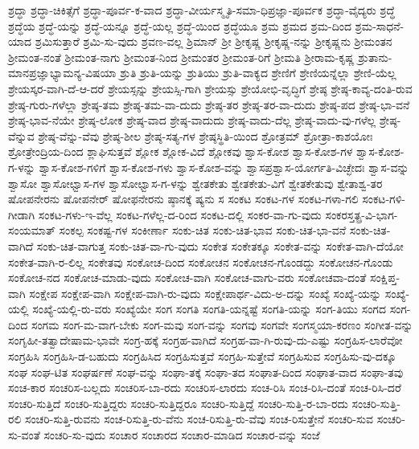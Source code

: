 {ಶ್ರದ್ಧಾ
ಶ್ರದ್ಧಾ-ಚಿಕಿತ್ಸೆಗೆ
ಶ್ರದ್ಧಾ-ಪೂರ್ವ-ಕ-ವಾದ
ಶ್ರದ್ಧಾ-ವೀರ್ಯಸ್ಮೃತಿ-ಸಮಾ-ಧಿಪ್ರಜ್ಞಾ-ಪೂರ್ವಕ
ಶ್ರದ್ಧಾ-ವೈದ್ಯರು
ಶ್ರದ್ಧೆ
ಶ್ರದ್ಧೆಯ
ಶ್ರದ್ಧೆ-ಯನ್ನು
ಶ್ರದ್ಧೆ-ಯನ್ನೂ
ಶ್ರದ್ಧೆ-ಯಲ್ಲ
ಶ್ರದ್ಧೆ-ಯಿಂದ
ಶ್ರದ್ಧೆಯೂ
ಶ್ರಮ
ಶ್ರಮದ
ಶ್ರಮ-ದಿಂದ
ಶ್ರಮ-ಸಾಧನೆ-ಯಾದ
ಶ್ರಮಿಸುತ್ತಾರೆ
ಶ್ರಮಿ-ಸು-ವುದು
ಶ್ರವಣ-ವಲ್ಲ
ಶ್ರಿಮಾನ್
ಶ್ರೀ
ಶ್ರೀಕೃಷ್ಣ
ಶ್ರೀಕೃಷ್ಣ-ನನ್ನು
ಶ್ರೀಕೃಷ್ಣನು
ಶ್ರೀಮಂತನ
ಶ್ರೀಮಂತ-ನಂತೆ
ಶ್ರೀಮಂತ-ನಾಗು
ಶ್ರೀಮಂತ-ನಿಂದ
ಶ್ರೀಮಂತರ
ಶ್ರೀಮಂತ-ರಿಗೆ
ಶ್ರೀಮತಿ
ಶ್ರೀರಾಮ-ಕೃಷ್ಣ
ಶ್ರುತಾನು-ಮಾನಪ್ರಜ್ಞಾಭ್ಯಾಮನ್ಯ-ವಿಷಯಾ
ಶ್ರುತಿ
ಶ್ರುತಿ-ಯನ್ನು
ಶ್ರುತಿಯು
ಶ್ರುತಿ-ವಾಕ್ಯದ
ಶ್ರೇಣಿಗೆ
ಶ್ರೇಣಿಯನ್ನೆಲ್ಲಾ
ಶ್ರೇಣಿ-ಯೆಲ್ಲ
ಶ್ರೇಯಸ್ಕರ-ವಾಗಿ-ದೆ-ಆ-ದರೆ
ಶ್ರೇಯಸ್ಸನ್ನು
ಶ್ರೇಯಸ್ಸಿ-ಗಾಗಿ
ಶ್ರೇಯಸ್ಸು
ಶ್ರೇಯೋಭಿ-ವೃದ್ಧಿಗೆ
ಶ್ರೇಷ್ಠ
ಶ್ರೇಷ್ಠ-ಕಾವ್ಯ-ದಂತಿ-ರುವ
ಶ್ರೇಷ್ಠ-ಗುರು-ಗಳೆಲ್ಲಾ
ಶ್ರೇಷ್ಠ-ತಮ
ಶ್ರೇಷ್ಠ-ತಮ-ವಾ-ದುದು
ಶ್ರೇಷ್ಠ-ತರ
ಶ್ರೇಷ್ಠ-ತರ-ವಾ-ದುದು
ಶ್ರೇಷ್ಠ-ಪದ
ಶ್ರೇಷ್ಠ-ಭಾ-ವನೆ
ಶ್ರೇಷ್ಠ-ಭಾವ-ನೆಯೇ
ಶ್ರೇಷ್ಠ-ಲೋಕ
ಶ್ರೇಷ್ಠ-ವಾದ
ಶ್ರೇಷ್ಠ-ವಾದುದು
ಶ್ರೇಷ್ಠ-ವಾದು-ದೆಲ್ಲ
ಶ್ರೇಷ್ಠ-ವಾದು-ವು-ಗಳೆಲ್ಲ
ಶ್ರೇಷ್ಠ-ವೆನ್ನುವ
ಶ್ರೇಷ್ಠ-ವೆನ್ನು-ವೆವು
ಶ್ರೇಷ್ಠ-ಶೀಲ
ಶ್ರೇಷ್ಠ-ಸತ್ಯ-ಗಳ
ಶ್ರೇಷ್ಠಸ್ಥಿತಿ-ಯಿಂದ
ಶ್ರೋತ್ರಮ್
ಶ್ರೋತ್ರಾ-ಕಾಶಯೋಃ
ಶ್ರೋತ್ರೇಂದ್ರಿಯ-ದಿಂದ
ಶ್ಲಾಘಿಸುತ್ತವೆ
ಶ್ಲೋಕ
ಶ್ಲೋಕ-ವಿದೆ
ಶ್ಲೋಕವು
ಶ್ವಾಸ-ಕೋಶ
ಶ್ವಾಸ-ಕೋಶ-ಗಳ
ಶ್ವಾಸ-ಕೋಶ-ಗ-ಳನ್ನು
ಶ್ವಾಸ-ಕೋಶ-ಗಳಿಗೆ
ಶ್ವಾಸ-ಕೋಶ-ಗಳು
ಶ್ವಾಸ-ಕೋಶ-ವನ್ನು
ಶ್ವಾಸಪ್ರಶ್ವಾಸ-ಯೋರ್ಗತಿ-ವಿಚ್ಛೇದಃ
ಶ್ವಾಸ-ವನ್ನು
ಶ್ವಾಸೋ
ಶ್ವಾಸೋಛ್ವಾಸ-ಗಳ
ಶ್ವಾಸೋಛ್ವಾಸ-ಗ-ಳನ್ನು
ಶ್ವೇತಕೇತು
ಶ್ವೇತಕೇತು-ವಿಗೆ
ಶ್ವೇತಕೇತುವು
ಶ್ವೇತಾಶ್ವ-ತರ
ಷೋಪನೇರನು
ಷೋಪನೇರ್
ಷೋಫನೇರನು
ಷ್ಠಾನಕ್ಕೆ
ಷ್ಯನು
ಸ
ಸಂಕಟ
ಸಂಕಟ-ಗಳ
ಸಂಕಟ-ಗಳಾ-ಗಲಿ
ಸಂಕಟ-ಗಳಿ-ಗೀಡಾಗಿ
ಸಂಕಟ-ಗಳು-ಇ-ವೆಲ್ಲ
ಸಂಕಟ-ಗಳೆಲ್ಲ-ದ-ರಿಂದ
ಸಂಕಟ-ದಲ್ಲಿ
ಸಂಕರ-ವಾ-ಗು-ವುದು
ಸಂಕರಸ್ತತ್ಪ್ರ-ವಿ-ಭಾಗ-ಸಂಯಮಾತ್
ಸಂಕಲ್ಪ
ಸಂಕಷ್ಟ-ಗಳ
ಸಂಕೀರ್ಣಾ
ಸಂಕು-ಚಿತ
ಸಂಕು-ಚಿತ-ಭಾವ
ಸಂಕು-ಚಿತ-ಭಾ-ವನೆ
ಸಂಕು-ಚಿತ-ವಾಗಿದೆ
ಸಂಕು-ಚಿತ-ವಾಗುತ್ತ
ಸಂಕು-ಚಿತ-ವಾ-ಗು-ವುದು
ಸಂಕೇತ
ಸಂಕೇತಕ್ಕೂ
ಸಂಕೇತ-ವನ್ನು
ಸಂಕೇತ-ವಾಗಿ-ದೆಯೋ
ಸಂಕೇತ-ವಾಗಿ-ರ-ಲಿಲ್ಲ
ಸಂಕೇತವು
ಸಂಕೋಚ-ದಿಂದ
ಸಂಕೋಚನ
ಸಂಕೋಚನ-ಗೊಂಡದ್ದು
ಸಂಕೋಚನ-ಗೊಂಡು
ಸಂಕೋಚ-ನದ
ಸಂಕೋಚ-ಮಾಡು-ವುದು
ಸಂಕೋಚ-ವಾಗಿ
ಸಂಕೋಚ-ವಾಗು-ವರು
ಸಂಕೋಚವಾ-ದಂತೆ
ಸಂಕ್ಷಿಪ್ತ-ವಾಗಿ
ಸಂಕ್ಷೇಪ
ಸಂಕ್ಷೇಪ-ವಾಗಿ
ಸಂಕ್ಷೇಪ-ವಾಗಿ-ರು-ವುದು
ಸಂಕ್ಷೇಪಾರ್ಥ-ವಿದು-ಅ-ದನ್ನು
ಸಂಖ್ಯೆ
ಸಂಖ್ಯೆ-ಯನ್ನು
ಸಂಖ್ಯೆ-ಯಲ್ಲಿ
ಸಂಖ್ಯೆ-ಯಲ್ಲಿ-ರು-ವರು
ಸಂಖ್ಯೆಯೇ
ಸಂಗ
ಸಂಗತಿ
ಸಂಗತಿ-ಯನ್ನಷ್ಟೆ
ಸಂಗತಿ-ಯನ್ನು
ಸಂಗ-ತಿಯು
ಸಂಗದ
ಸಂಗ-ದಿಂದ
ಸಂಗಮ
ಸಂಗ-ಮ-ವಾಗ-ಬೇಕು
ಸಂಗ-ಮವು
ಸಂಗ-ವನ್ನು
ಸಂಗವು
ಸಂಗವೇ
ಸಂಗಸ್ಮಯಾ-ಕರಣಂ
ಸಂಗೀತ-ವನ್ನು
ಸಂಗೃಹೀ-ತತ್ವಾದೇಷಾಮ-ಭಾವೇ
ಸಂಗ್ರ-ಹಕ್ಕೆ
ಸಂಗ್ರಹ-ವಾಗಿದೆ
ಸಂಗ್ರಹ-ವಾ-ಗಿ-ರುವು-ದು-ಎಷ್ಟು
ಸಂಗ್ರಹಿಸ-ಲಾರೆವೋ
ಸಂಗ್ರಹಿಸಿ
ಸಂಗ್ರಹಿಸಿ-ಡ-ಬಹುದು
ಸಂಗ್ರಹಿಸಿದ
ಸಂಗ್ರಹಿಸುತ್ತವೆ
ಸಂಗ್ರಹಿ-ಸುತ್ತೇವೆ
ಸಂಗ್ರಹಿಸುವ
ಸಂಗ್ರಹಿಸು-ವು-ದಕ್ಕೂ
ಸಂಘ
ಸಂಘ-ಟಿತ
ಸಂಘರ್ಷಣೆ
ಸಂಘ-ವನ್ನು
ಸಂಘಾ-ತಕ್ಕೆ
ಸಂಘಾ-ತದ
ಸಂಘಾತ-ದಿಂದ
ಸಂಘಾತ-ವಾದ
ಸಂಘಾ-ತವು
ಸಂಚ-ಕಾರ
ಸಂಚರಿಸ-ಬಲ್ಲದು
ಸಂಚರಿಸ-ಬಾ-ರದು
ಸಂಚರಿಸ-ಲಾರದು
ಸಂಚ-ರಿಸಿ
ಸಂಚ-ರಿಸಿ-ದಂತೆ
ಸಂಚ-ರಿಸಿ-ದರೆ
ಸಂಚರಿ-ಸುತ್ತಿದೆ
ಸಂಚರಿ-ಸುತ್ತಿದ್ದರು
ಸಂಚರಿ-ಸುತ್ತಿದ್ದರೂ
ಸಂಚರಿ-ಸುತ್ತಿದ್ದೆ
ಸಂಚರಿ-ಸುತ್ತಿ-ರ-ಬಾ-ರದು
ಸಂಚರಿ-ಸುತ್ತಿ-ರಲಿ
ಸಂಚರಿ-ಸುತ್ತಿ-ರುವನು
ಸಂಚ-ರಿಸುತ್ತಿ-ರು-ವೆನು
ಸಂಚ-ರಿಸುತ್ತಿ-ರು-ವೆವು
ಸಂಚ-ರಿಸುತ್ತೇನೆ
ಸಂಚರಿ-ಸುವ
ಸಂಚರಿ-ಸು-ವಂತೆ
ಸಂಚರಿ-ಸು-ವುದು
ಸಂಚಾರ
ಸಂಚಾರದ
ಸಂಚಾರ-ಮಾಡಿದ
ಸಂಚಾರ-ವನ್ನು
ಸಂಜೆ
}
